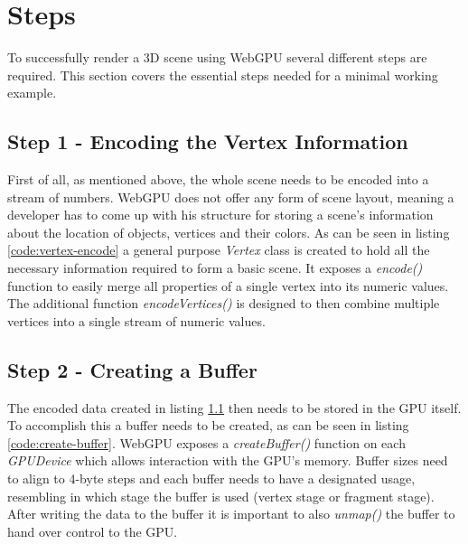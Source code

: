 \section{Steps}

To successfully render a 3D scene using WebGPU several different steps are required. 
This section covers the essential steps needed for a minimal working example.



\subsection{Step 1 - Encoding the Vertex Information}
\label{section:practical-step-1}

First of all, as mentioned above, the whole scene needs to be encoded into a stream of numbers. WebGPU does not offer any form of scene layout, meaning a developer
has to come up with his structure for storing a scene's information about the location of objects, vertices and their colors. As can be seen in listing \ref*{code:vertex-encode} a general 
purpose \emph{Vertex} class is created to hold all the necessary information required to form a basic scene. It exposes a  \emph{encode()} function to easily merge all properties of a single vertex 
into its numeric values. The additional function \emph{encodeVertices()} is designed to then combine multiple vertices into a single stream of numeric values. 

\begin{samepage}
  
    {
      An exemplary illustration of how to encode vertex information for use in WebGPU
    }},
    language=TypeScript,
    firstnumber=1,
    label=code:vertex-encode
    ]
    {listings/vertex.ts}
\end{samepage}


\subsection{Step 2 - Creating a Buffer}

The encoded data created in listing \ref*{section:practical-step-1} then needs to be stored in the GPU itself. To accomplish this a buffer needs to be created, as can be seen in listing \ref*{code:create-buffer}. 
WebGPU exposes a \emph{createBuffer()} function on each \emph{GPUDevice} which allows interaction with the GPU's memory. Buffer sizes need to align to 4-byte steps and each buffer needs to 
have a designated usage, resembling in which stage the buffer is used (vertex stage or fragment stage). After writing the data to the buffer it is important to also \emph{unmap()} the buffer 
to hand over control to the GPU. 


